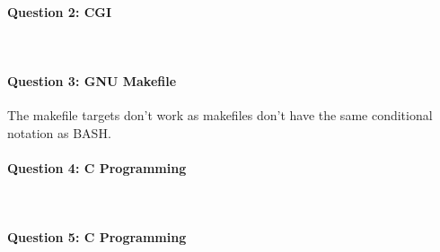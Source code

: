 \documentclass[12 pt]{article}
\begin{document}
\paragraph{Question 2: CGI}~

\paragraph{Question 3: GNU Makefile} The makefile targets don't work as makefiles don't have the same conditional notation as BASH.

\paragraph{Question 4: C Programming}~

\paragraph{Question 5: C Programming}~

\end{document}
